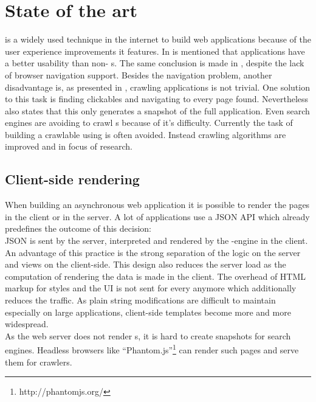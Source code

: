 \section{State of the art\label{chap:state_of_the_art}}
\ajax{} is a widely used technique in the internet to build web applications because of the user experience improvements it features.
In \cite{roodt2006effect} is mentioned that \ajax{} applications have a better usability than non-\ajax{} \webSite{}s.
The same conclusion is made in \cite{kluge2007effects}, despite the lack of browser navigation support.
Besides the navigation problem, another disadvantage is, as presented in \cite{mesbah2009analysis}, crawling \ajax{} applications is not trivial.
One solution to this task is finding clickables and navigating to every page found.
Nevertheless \cite{mesbah2009analysis} also states that this only generates a snapshot of the full application.
Even search engines are avoiding to crawl \webSite{}s because of it's difficulty\cite{duda2009ajax}.
Currently the task of building a crawlable \singlePageApplication{} using \ajax{} is often avoided. Instead crawling algorithms are improved and in focus of research.

\subsection{Client-side rendering\label{sec:state_client_side_rendering}}
When building an asynchronous web application it is possible to render the pages in the client or in the server.
A lot of \ajax{} applications use a JSON API which already predefines the outcome of this decision:
\\
JSON is sent by the server, interpreted and rendered by the \ajax{}-engine in the client.
An advantage of this practice is the strong separation of the logic on the server and views on the client-side.
This \webApplication{} design also reduces the server load as the computation of rendering the data is made in the client.
The overhead of HTML markup for styles and the UI is not sent for every \webPage{} anymore which additionally reduces the traffic.
As plain string modifications are difficult to maintain especially on large applications, client-side templates become more and more widespread.
\\
As the web server does not render \webPage{}s, it is hard to create snapshots for search engines.
Headless browsers like \enquote{Phantom.js}\footnote{http://phantomjs.org/} can render such pages and serve them for crawlers.

